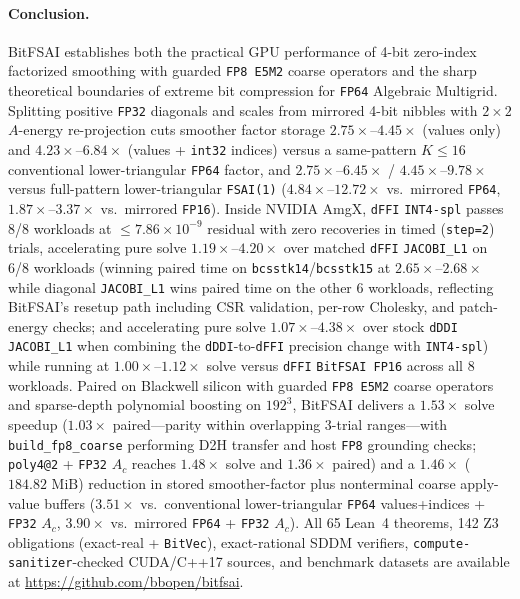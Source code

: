 \documentclass[10pt]{article}
\begin{document}
\paragraph{Conclusion.} BitFSAI establishes both the practical GPU performance of 4-bit zero-index factorized smoothing with guarded \texttt{FP8 E5M2} coarse operators and the sharp theoretical boundaries of extreme bit compression for \texttt{FP64} Algebraic Multigrid. Splitting positive \texttt{FP32} diagonals and scales from mirrored 4-bit nibbles with $2\times 2$ $A$-energy re-projection cuts smoother factor storage $2.75\times$--$4.45\times$ (values only) and $4.23\times$--$6.84\times$ (values + \texttt{int32} indices) versus a same-pattern $K \le 16$ conventional lower-triangular \texttt{FP64} factor, and $2.75\times$--$6.45\times$ / $4.45\times$--$9.78\times$ versus full-pattern lower-triangular \texttt{FSAI(1)} ($4.84\times$--$12.72\times$ vs.\ mirrored \texttt{FP64}, $1.87\times$--$3.37\times$ vs.\ mirrored \texttt{FP16}). Inside NVIDIA AmgX, \texttt{dFFI} \texttt{INT4-spl} passes 8/8 workloads at $\le 7.86\times 10^{-9}$ residual with zero recoveries in timed (\texttt{step=2}) trials, accelerating pure solve $1.19\times$--$4.20\times$ over matched \texttt{dFFI} \texttt{JACOBI\_L1} on 6/8 workloads (winning paired time on \texttt{bcsstk14}/\texttt{bcsstk15} at $2.65\times$--$2.68\times$ while diagonal \texttt{JACOBI\_L1} wins paired time on the other 6 workloads, reflecting BitFSAI's resetup path including CSR validation, per-row Cholesky, and patch-energy checks; and accelerating pure solve $1.07\times$--$4.38\times$ over stock \texttt{dDDI} \texttt{JACOBI\_L1} when combining the \texttt{dDDI}-to-\texttt{dFFI} precision change with \texttt{INT4-spl}) while running at $1.00\times$--$1.12\times$ solve versus \texttt{dFFI} \texttt{BitFSAI FP16} across all 8 workloads. Paired on Blackwell silicon with guarded \texttt{FP8 E5M2} coarse operators and sparse-depth polynomial boosting on $192^3$, BitFSAI delivers a $1.53\times$ solve speedup ($1.03\times$ paired---parity within overlapping 3-trial ranges---with \texttt{build\_fp8\_coarse} performing D2H transfer and host \texttt{FP8} grounding checks; \texttt{poly4@2} + \texttt{FP32} $A_c$ reaches $1.48\times$ solve and $1.36\times$ paired) and a $1.46\times$ ($184.82\text{ MiB}$) reduction in stored smoother-factor plus nonterminal coarse apply-value buffers ($3.51\times$ vs.\ conventional lower-triangular \texttt{FP64} values+indices + \texttt{FP32} $A_c$, $3.90\times$ vs.\ mirrored \texttt{FP64} + \texttt{FP32} $A_c$). All 65 Lean~4 theorems, 142 Z3 obligations (exact-real + \texttt{BitVec}), exact-rational SDDM verifiers, \texttt{compute-sanitizer}-checked CUDA/C++17 sources, and benchmark datasets are available at \url{https://github.com/bbopen/bitfsai}.
\end{document}

